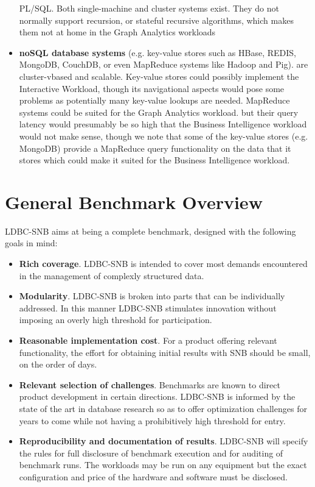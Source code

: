 \begin{itemize}
     PL/SQL. Both single-machine and cluster systems exist.  They  do not
     normally support recursion, or stateful recursive algorithms, which makes
     them not at home in the Graph Analytics workloads
 \item \textbf{noSQL database systems} (e.g. key-value stores such as HBase,
     REDIS, MongoDB, CouchDB, or even MapReduce systems like Hadoop and Pig).
     are cluster-vbased and scalable. Key-value stores could possibly implement
     the Interactive Workload, though its navigational aspects would pose some
     problems as potentially many key-value lookups are needed. MapReduce
     systems could be suited for the Graph Analytics workload.  but their query
     latency would presumably be so high that the Business Intelligence
     workload would not make sense, though we note that some of the key-value
     stores (e.g. MongoDB) provide a MapReduce query functionality on the data
     that it stores which could make it suited for the Business Intelligence workload.
\end{itemize}


\section{General Benchmark Overview}

LDBC-SNB aims at being a complete benchmark, designed with the following goals in mind:

\begin{itemize}
 \item \textbf{Rich coverage}. LDBC-SNB is intended to cover most demands
     encountered in the management of complexly structured data. 
 \item \textbf{Modularity}. LDBC-SNB is broken into parts that can be
     individually addressed. In this manner LDBC-SNB
     stimulates innovation without imposing an overly high threshold for
     participation.
 \item \textbf{Reasonable implementation cost}. For a product offering relevant
     functionality, the effort for obtaining initial results with SNB should be
     small, on the order of days.
 \item \textbf{Relevant selection of challenges}. Benchmarks are known to
     direct product development in certain directions. LDBC-SNB is informed by
     the state of the art in database research so as to offer optimization
     challenges for years to come while not having a prohibitively high
     threshold for entry.
 \item \textbf{Reproducibility and documentation of results}. LDBC-SNB
     will specify the rules for full disclosure of benchmark execution and for
     auditing of benchmark runs. The workloads may be run on any equipment
     but the exact configuration and price of the hardware and software must be
     disclosed.
\end{itemize}

